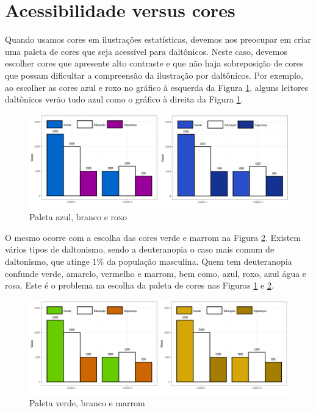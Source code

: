 \documentclass[12pt]{article}   %
\begin{document}
	\section{Acessibilidade versus cores}
		\par Quando usamos cores em ilustrações estatísticas, devemos nos preocupar em criar uma paleta de cores que seja acessível para daltônicos. Neste caso, devemos escolher cores que apresente alto contraste e que não haja sobreposição de cores que possam dificultar a compreensão da ilustração por daltônicos. Por exemplo, ao escolher as cores azul e roxo no gráfico à esquerda da Figura \ref{fig:azulroxo}, alguns leitores daltônicos verão tudo azul como o gráfico à direita da Figura \ref{fig:azulroxo}.
		
			\begin{figure}[h!]
				\centering
				\caption{Paleta azul, branco e roxo}
				\label{fig:azulroxo}
				\vspace{+12pt}
				\includegraphics[scale=0.3]{AzulRoxo}
			\end{figure}
		\vspace{+16pt}
	
	    \par O mesmo ocorre com a escolha das cores verde e marrom na Figura \ref{fig:verdemarrom}. Existem vários tipos de daltonismo, sendo a deuteranopia o caso mais comum de daltonismo, que atinge $1\%$ da população masculina. Quem tem deuteranopia confunde verde, amarelo, vermelho e marrom, bem como, azul, roxo, azul água e rosa. Este é o problema na escolha da paleta de cores nas Figuras \ref{fig:azulroxo} e \ref{fig:verdemarrom}.
	    
	  		\begin{figure}[h!]
	    		\centering
	    		\caption{Paleta verde, branco e marrom}
	    		\label{fig:verdemarrom}
	    		\vspace{+12pt}
	    		\includegraphics[scale=0.3]{VerdeMarrom}
	    	\end{figure}
    	\vspace{+16pt}
    
\end{document}
